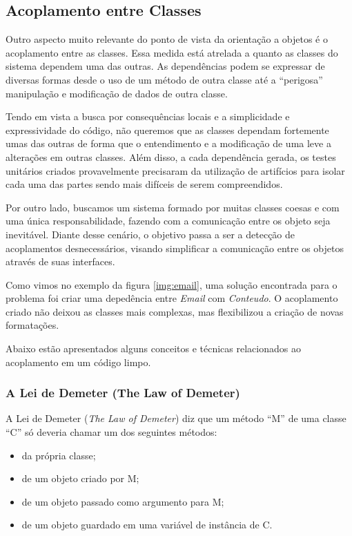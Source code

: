 

\subsection{Acoplamento entre Classes}
Outro aspecto muito relevante do ponto de vista da orientação a objetos é o acoplamento entre as classes. Essa medida 
está atrelada a quanto as classes do sistema dependem uma das outras. As dependências podem se expressar de diversas 
formas desde o uso de um método de outra classe até a ``perigosa'' manipulação e modificação de dados de outra classe.
	
Tendo em vista a busca por consequências locais e a simplicidade e expressividade do código, não queremos que as 
classes dependam fortemente umas das outras de forma que o entendimento e a modificação de uma leve a alterações em 
outras classes. Além disso, a cada dependência gerada, os testes unitários criados provavelmente precisaram da 
utilização de artifícios para isolar cada uma das partes sendo mais difíceis de serem compreendidos.

Por outro lado, buscamos um sistema formado por muitas classes coesas e com uma única responsabilidade, fazendo com a comunicação 
entre os objeto seja inevitável. Diante desse cenário, o objetivo passa a ser a detecção de acoplamentos desnecessários, visando 
simplificar a comunicação entre os objetos através de suas interfaces.

Como vimos no exemplo da figura \ref{img:email}, uma solução encontrada para o problema foi criar uma depedência entre \textit{Email} 
com \textit{Conteudo}. O acoplamento criado não deixou as classes mais complexas, mas flexibilizou a criação de novas formatações.

Abaixo estão apresentados alguns conceitos e técnicas relacionados ao acoplamento em um código limpo.

\subsubsection{A Lei de Demeter (The Law of Demeter)}
A Lei de Demeter (\textit{The Law of Demeter}) diz que um método ``M'' de uma classe ``C'' só deveria chamar um dos 
seguintes métodos:

\begin{itemize}
	\item da própria classe;
	\item de um objeto criado por M;
	\item de um objeto passado como argumento para M;
	\item de um objeto guardado em uma variável de instância de C.
\end{itemize}

